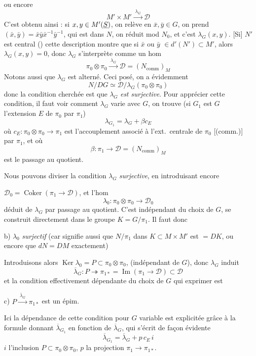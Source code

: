 \documentclass[11pt,a4paper]{article}
\begin{document}
ou encore
\[
  M' \times M' \xrightarrow{\;\lambda_G\;} \mathcal{D}
\]
C'est obtenu ainsi : si $x, y \in M'(\uncertain{S})$, on relève en $\bar{x}, \bar{y} \in G$, on prend $(\bar{x}, \bar{y}) = \bar{x}\bar{y}\bar{x}^{-1}\bar{y}^{-1}$, qui est dans $N$, on réduit mod $N_0$, et c'est $\lambda_G(x, y)$.  [Si] $N'$ est central () cette description montre que si $\bar{x}$ ou $\bar{y}$ $\in d'(N') \subset M'$, alors \struck{\ill{}} $\lambda_G(x, y) = 0$, donc $\lambda_G$ s'interprète comme un hom
\[
  \pi_0 \otimes \pi_0 \xrightarrow{\;\lambda_G\;} \mathcal{D} = (N_{\mathrm{comm}})_{M}
\]
Notons aussi que $\lambda_G$ est alterné. Ceci posé,  on a évidemment
\[
  N/DG \simeq \mathcal{D}/\lambda_G(\pi_0 \otimes \pi_0)
\]
donc la condition cherchée est que $\lambda_G$ \emph{est surjective}. Pour apprécier cette condition, il faut voir comment $\lambda_G$ varie avec $G$, on trouve (si $G_1$ est  $G$  l'extension $E$ de $\pi_0$ par $\pi_1$)
\[
  \lambda_{G_1} = \lambda_G + \beta c_E
\]
où $c_E \colon \pi_0 \otimes \pi_0 \to \pi_1$ est l'accouplement associé à l'ext.\ centrale de $\pi_0$ [(comm.)] par $\pi_1$, et où
\[
  \beta \colon \pi_1 \longrightarrow \mathcal{D} = (N_{\mathrm{comm}})_{M}
\]
est le passage au quotient. 

Nous pouvons diviser la condition $\lambda_G$ \emph{surjective}, en introduisant encore

$\mathcal{D}_0 = \operatorname{Coker}(\pi_1 \to \mathcal{D})$, et l'hom
\[
  \lambda_0 \colon \pi_0 \otimes \pi_0 \longrightarrow \mathcal{D}_0
\]
déduit de $\lambda_G$ par passage au quotient. C'est indépendant du choix de $G$,  se construit directement dans le groupe $K = G/\pi_1$. Il faut donc

b) $\lambda_0$ \emph{surjectif} (car signifie aussi que $N/\pi_1$ dans $K \subset M \times M'$ est $= DK$, ou encore que $dN = DM$ \ill{} exactement)

\struck{\ill{}} Introduisons alors $\operatorname{Ker}\lambda_0 = P \subset \pi_0 \otimes \pi_0$, (indépendant de $G$), donc $\lambda_G$ induit
\[
  \overline{\lambda}_G \colon P \twoheadrightarrow \pi_{1*} = \operatorname{Im}(\pi_1 \to \mathcal{D}) \subset \mathcal{D}
\]
et la condition effectivement dépendante du choix de $G$ qui  exprimer est

c) $P \xrightarrow{\;\overline{\lambda}_G\;} \pi_{1*}$ est un épim.

Ici la dépendance de cette condition pour $G$ variable est explicitée grâce à la formule donnant $\overline{\lambda}_{G_1}$ en fonction de $\overline{\lambda}_G$, qui s'écrit de façon évidente
\[
  \overline{\lambda}_{G_1} = \overline{\lambda}_G + p\, c_E\, i
\]
$i$ l'inclusion $P \subset \pi_0 \otimes \pi_0$, $p$ la projection $\pi_1 \to \pi_{1*}$.
\end{document}
